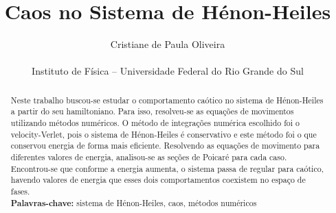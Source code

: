\documentclass[brazilian, 10pt, a4paper, final]{article}
\title{\textbf{Caos no Sistema de Hénon-Heiles}}
\author{Cristiane de Paula Oliveira\\\\\small{Instituto de Física -- Universidade Federal do Rio Grande do Sul}}
\begin{document}
\maketitle


\begin{abstract}
  \noindent
  Neste trabalho buscou-se estudar o comportamento caótico no sistema de Hénon-Heiles a partir do seu hamiltoniano. Para isso, resolveu-se as equações de movimentos utilizando métodos numéricos. O método de integrações numérica escolhido foi o velocity-Verlet, pois o sistema de Hénon-Heiles é conservativo e este método foi o que conservou energia de forma mais eficiente. Resolvendo as equações de movimento para diferentes valores de energia, analisou-se as seções de Poicaré para cada caso. Encontrou-se que conforme a energia aumenta, o sistema passa de regular para caótico, havendo valores de energia que esses dois comportamentos coexistem no espaço de fases.
  \\ \textbf{Palavras-chave:} sistema de Hénon-Heiles, caos, métodos numéricos
\end{abstract}
\end{document}
